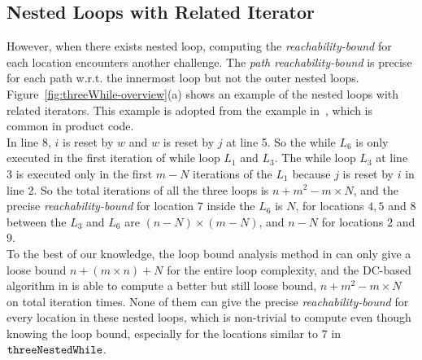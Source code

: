 \subsection{Nested Loops with Related Iterator}
\label{sec:overview-nestedwhile}
However, when there exists nested loop, computing the \emph{reachability-bound} for each location encounters another challenge.
The \emph{path reachability-bound} is precise for each path w.r.t. the innermost loop but not the outer nested loops.
Figure~\ref{fig:threeWhile-overview}(a) shows an example of the nested loops with related 
iterators.
This example is adopted from the example in~\cite{GulwaniJK09}, which is common in product code.
\\
In line 8, $i$ is reset by $w$ and $w$ is reset by $j$ at line 5. So the
while $L_6$ is only executed in the first iteration of while loop $L_1$ and $L_3$.
The while loop $L_3$ at line 3 is executed only in 
the first $m - N$ iterations of the 
$L_1$ because $j$ is reset by $i$ in line 2.
So the total iterations of all the three loops is
$n + m^2 - m \times N$,
and the precise \emph{reachability-bound} for location $7$ inside the $L_6$ is $N$,
for locations $4, 5$ and $8$ between the $L_3$ and $L_6$ are $(n-N) \times (m - N)$,
and $n - N$ for locations $2$ and $9$.
\\
To the best of our knowledge, the loop bound analysis method in \cite{GulwaniJK09} can only give a loose bound $n + (m \times n) + N$ for the entire loop complexity, and 
the DC-based algorithm in \cite{sinn2017complexity} is able to
compute a better but still loose bound, $n + m^2 - m \times N$ on total iteration times.
None of them can give the precise \emph{reachability-bound} for every location in these nested loops,
which is non-trivial to compute even though knowing the loop bound,
especially for the locations similar to $7$ in $\mathtt{threeNestedWhile}$.
\\
